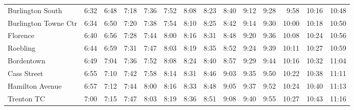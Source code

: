 \begin{center}
\begin{tabular}{@{}lrrrrrrrrrrrrr@{}}
Burlington South & 6:32 & 6:48 & 7:18 & 7:36 & 7:52 & 8:08 & 8:23 & 8:40 & 9:12 & 9:28 & 9:58 & 10:16 & 10:48 \\
Burlington Towne Ctr & 6:34 & 6:50 & 7:20 & 7:38 & 7:54 & 8:10 & 8:25 & 8:42 & 9:14 & 9:30 & 10:00 & 10:18 & 10:50 \\
Florence & 6:40 & 6:56 & 7:28 & 7:44 & 8:00 & 8:16 & 8:31 & 8:48 & 9:20 & 9:36 & 10:08 & 10:24 & 10:56 \\
Roebling & 6:44 & 6:59 & 7:31 & 7:47 & 8:03 & 8:19 & 8:35 & 8:52 & 9:24 & 9:39 & 10:11 & 10:27 & 10:59 \\
Bordentown & 6:49 & 7:04 & 7:36 & 7:52 & 8:08 & 8:24 & 8:40 & 8:57 & 9:29 & 9:44 & 10:16 & 10:32 & 11:04 \\
Cass Street & 6:55 & 7:10 & 7:42 & 7:58 & 8:14 & 8:31 & 8:46 & 9:03 & 9:35 & 9:50 & 10:22 & 10:38 & 11:11 \\
Hamilton Avenue & 6:57 & 7:12 & 7:44 & 8:00 & 8:16 & 8:33 & 8:48 & 9:05 & 9:37 & 9:52 & 10:24 & 10:40 & 11:13 \\
Trenton TC & 7:00 & 7:15 & 7:47 & 8:03 & 8:19 & 8:36 & 8:51 & 9:08 & 9:40 & 9:55 & 10:27 & 10:43 & 11:16 \\
\bottomrule\end{tabular}\end{center}
